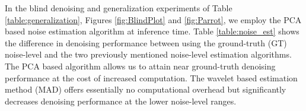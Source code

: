 \documentclass[conference]{IEEEtran}
\begin{document}
\begin{table}[ht]
\centering
\caption{Blind denoising and generalization comparison to DnCNN-B \cite{DnCNN} and BF-CNN \cite{Mohan2020}. All models are trained on $\sigma_n^{\mathrm{train}}=[0,55]$. Average test PSNR on BSD68 \cite{bsd} is reported.}
\label{table:generalization}
\end{table}

In the blind denoising and generalization experiments of Table \ref{table:generalization}, Figures \ref{fig:BlindPlot} and \ref{fig:Parrot}, we employ the PCA based noise estimation algorithm \cite{Liu2013} at inference time. Table \ref{table:noise_est} shows the difference in denoising performance between using the ground-truth (GT)  noise-level and the two previously mentioned noise-level estimation algorithms. The PCA based algorithm allows us to attain near ground-truth denoising performance at the cost of increased computation. The wavelet based estimation method (MAD) offers essentially no computational overhead but significantly decreases denoising performance at the lower noise-level ranges.

\begin{table}[ht]
\centering
\caption{Effect of noise estimation algorithm on performance of the noise adaptive model Big-CDLNet-A.}
\label{table:noise_est}
\end{table}
\end{document}
